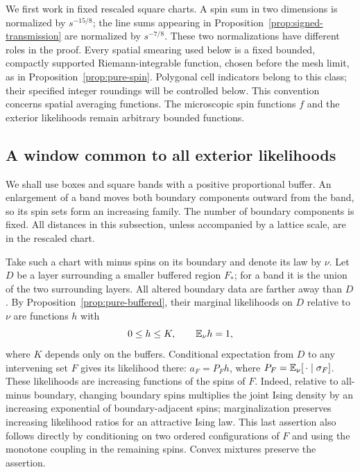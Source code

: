 We first work in fixed rescaled square charts.  A spin sum in two
dimensions is normalized by $s^{-15/8}$; the line sums appearing in
Proposition~\ref{prop:signed-transmission} are normalized by $s^{-7/8}$.
These two normalizations have different roles in the proof.
Every spatial smearing used below is a fixed bounded, compactly supported
Riemann-integrable function, chosen before the mesh limit, as in
Proposition~\ref{prop:pure-spin}.  Polygonal cell indicators belong to
this class; their specified integer roundings will be controlled below.
This convention concerns spatial averaging functions.  The microscopic
spin functions $f$ and the exterior likelihoods remain arbitrary bounded
functions.

\subsection{A window common to all exterior likelihoods}

We shall use boxes and square bands with a positive proportional buffer.
An enlargement of a band moves both boundary components outward from the
band, so its spin sets form an increasing family.  The number of boundary
components is fixed.  All distances in this subsection, unless accompanied
by a lattice scale, are in the rescaled chart.

Take such a chart with minus spins on its boundary and denote its law by
$\nu$.  Let $D$ be a layer surrounding a smaller buffered region $F_*$;
for a band it is the union of the two surrounding layers.  All altered
boundary data are farther away than $D$.  By
Proposition~\ref{prop:pure-buffered}, their marginal likelihoods on $D$
relative to $\nu$ are functions $h$ with
\begin{equation}
 0\leq h\leq K,\qquad \mathbb E_\nu h=1,
 \label{eq:transfer-layer-density}
\end{equation}
where $K$ depends only on the buffers.  Conditional expectation from $D$
to any intervening set $F$ gives its likelihood there:
$a_F=P_Fh$, where $P_F=\mathbb E_\nu[\,\cdot\mid\sigma_F]$.
These likelihoods are increasing functions of the spins of $F$.  Indeed,
relative to all-minus boundary, changing boundary spins multiplies the
joint Ising density by an increasing exponential of boundary-adjacent
spins; marginalization preserves increasing likelihood ratios for an
attractive Ising law.  This last assertion also follows directly by
conditioning on two ordered configurations of $F$ and using the monotone
coupling in the remaining spins.  Convex mixtures preserve the assertion.

